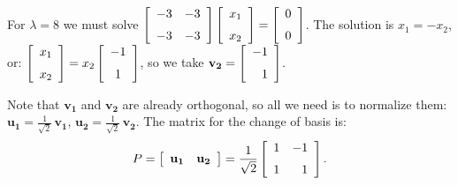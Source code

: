 \documentclass[12pt]{article}
\begin{document}
{For $\lambda=8$ we must solve 
$\displaystyle{
\left [\begin {array}{rr} -3&-3\\
\noalign{\medskip}-3&-3\end {array}
\right ]
\left [\begin {array}{c} x_1\\\noalign{\medskip}x_2
\end {array}\right ]
=
\left [\begin {array}{c} 0\\\noalign{\medskip}0
\end {array}\right ]
}$.
The solution is $x_1 = -x_2$, or:
$\displaystyle{
\left [\begin {array}{c} x_{{1}}\\\noalign{\medskip}x_{{2}}
\end {array}\right ]=x_{{2}}\left [\begin {array}{c} -1
\\\noalign{\medskip}1\end {array}\right ]
}$, so we take 
$\displaystyle{\mathbf{v_2} = 
\left [\begin {array}{r} -1
\\\noalign{\medskip}1\end {array}\right ]
}$.

Note that $\mathbf{v_1}$ and $\mathbf{v_2}$ are already orthogonal, 
so all we need is to normalize them:
$\mathbf{u_1} = \frac{1}{\sqrt{2}}\,\mathbf{v_1}$,
$\mathbf{u_2} = \frac{1}{\sqrt{2}}\,\mathbf{v_2}$.
The matrix for the change of basis is:
\[
P = 
\left[ \begin{array}{cc} \mathbf{u_1} & \mathbf{u_2} \end{array} \right] 
= 
\frac{1}{\sqrt{2}}
\left [\begin {array}{rr} 1&-1\\\noalign{\medskip}1&1\end {array}
\right ].
\]

}
\end{document}
